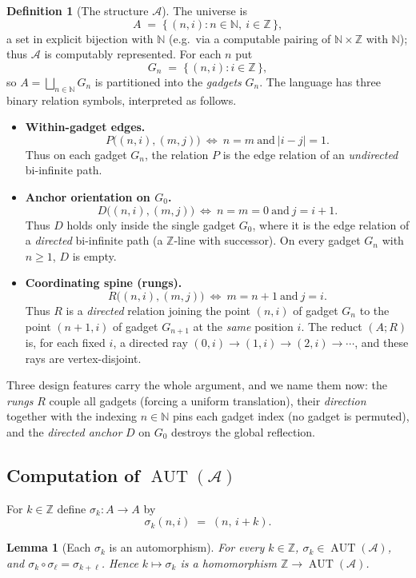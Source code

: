 \documentclass[12pt,fullpage]{article}
\newtheorem{lemma}[theorem]{Lemma}
\theoremstyle{definition}
\newtheorem{definition}[theorem]{Definition}
\newcommand{\A}{\mathcal{A}}
\newcommand{\N}{\mathbb{N}}
\newcommand{\Z}{{\mathbb{Z}}}
\newcommand{\AUT}{\operatorname{AUT}}
\begin{document}
\begin{definition}[The structure $\A$]\label{def:A}
The universe is
\[
A \;=\; \{\,(n,i) : n\in\N,\ i\in\Z\,\},
\]
a set in explicit bijection with $\N$ (e.g.\ via a computable pairing of
$\N\times\Z$ with $\N$); thus $\A$ is computably represented.  For each $n$ put
\[
G_n \;=\; \{\,(n,i) : i\in\Z\,\},
\]
so $A=\bigsqcup_{n\in\N}G_n$ is partitioned into the \emph{gadgets} $G_n$.
The language has three binary relation symbols, interpreted as follows.
\begin{itemize}
\item \textbf{Within-gadget edges.}
  \[
  P\bigl((n,i),(m,j)\bigr)\ \Longleftrightarrow\ n=m\ \text{and}\ |i-j|=1 .
  \]
  Thus on each gadget $G_n$, the relation $P$ is the edge relation of an
  \emph{undirected} bi-infinite path.
\item \textbf{Anchor orientation on $G_0$.}
  \[
  D\bigl((n,i),(m,j)\bigr)\ \Longleftrightarrow\ n=m=0\ \text{and}\ j=i+1 .
  \]
  Thus $D$ holds only inside the single gadget $G_0$, where it is the edge
  relation of a \emph{directed} bi-infinite path (a $\Z$-line with successor).
  On every gadget $G_n$ with $n\ge 1$, $D$ is empty.
\item \textbf{Coordinating spine (rungs).}
  \[
  R\bigl((n,i),(m,j)\bigr)\ \Longleftrightarrow\ m=n+1\ \text{and}\ j=i .
  \]
  Thus $R$ is a \emph{directed} relation joining the point $(n,i)$ of gadget
  $G_n$ to the point $(n+1,i)$ of gadget $G_{n+1}$ at the \emph{same} position
  $i$.  The reduct $(A;R)$ is, for each fixed $i$, a directed ray
  $(0,i)\to(1,i)\to(2,i)\to\cdots$, and these rays are vertex-disjoint.
\end{itemize}
\end{definition}

Three design features carry the whole argument, and we name them now:
the \emph{rungs} $R$ couple all gadgets (forcing a uniform translation), their
\emph{direction} together with the indexing $n\in\N$ pins each gadget index
(no gadget is permuted), and the \emph{directed anchor} $D$ on $G_0$ destroys
the global reflection.

\subsection*{Computation of $\AUT(\A)$}

For $k\in\Z$ define $\sigma_k\colon A\to A$ by
\[
\sigma_k(n,i) \;=\; (n,\,i+k).
\]

\begin{lemma}[Each $\sigma_k$ is an automorphism]\label{lem:shifts-are-auts}
For every $k\in\Z$, $\sigma_k\in\AUT(\A)$, and $\sigma_k\circ\sigma_\ell=
\sigma_{k+\ell}$.  Hence $k\mapsto\sigma_k$ is a homomorphism $\Z\to\AUT(\A)$.
\end{lemma}
\end{document}
